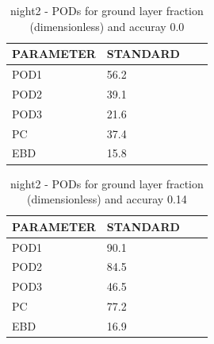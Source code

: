 \begin{table}[p!]
\begin{center}
\begin{tabular}{|l|l|l|l|}
\hline
\multicolumn{1}{|c|}{\cellcolor[HTML]{C0C0C0}\textbf{PARAMETER}} & \multicolumn{1}{c|}{\cellcolor[HTML]{C0C0C0}\textbf{STANDARD}} \\
\hline
\cellcolor[HTML]{C0C0C0}POD1  & 56.2                                \\
\cellcolor[HTML]{C0C0C0}POD2  & 39.1                                \\
\cellcolor[HTML]{C0C0C0}POD3  & 21.6                                \\
\cellcolor[HTML]{C0C0C0}PC    & 37.4                                  \\
\cellcolor[HTML]{C0C0C0}EBD   & 15.8                                 \\
\hline
\end{tabular}
\caption{night2 - PODs for ground layer fraction (dimensionless) and accuray 0.0}
\label{tab:podglf0.0:night2}
\end{center}
\end{table}
\begin{table}[p!]
\begin{center}
\begin{tabular}{|l|l|l|l|}
\hline
\multicolumn{1}{|c|}{\cellcolor[HTML]{C0C0C0}\textbf{PARAMETER}} & \multicolumn{1}{c|}{\cellcolor[HTML]{C0C0C0}\textbf{STANDARD}} \\
\hline
\cellcolor[HTML]{C0C0C0}POD1  & 90.1                                \\
\cellcolor[HTML]{C0C0C0}POD2  & 84.5                                \\
\cellcolor[HTML]{C0C0C0}POD3  & 46.5                                \\
\cellcolor[HTML]{C0C0C0}PC    & 77.2                                  \\
\cellcolor[HTML]{C0C0C0}EBD   & 16.9                                 \\
\hline
\end{tabular}
\caption{night2 - PODs for ground layer fraction (dimensionless) and accuray 0.14}
\label{tab:podglf0.14:night2}
\end{center}
\end{table}
